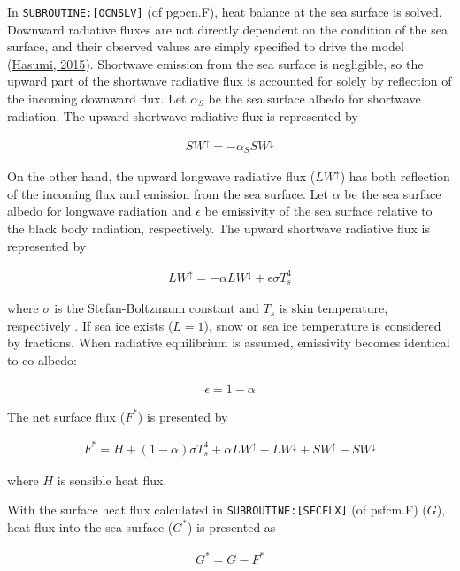 In \texttt{SUBROUTINE:{[}OCNSLV{]}} (of pgocn.F), heat balance at the
sea surface is solved. Downward radiative fluxes are not directly
dependent on the condition of the sea surface, and their observed values
are simply specified to drive the model
(\href{https://ccsr.aori.u-tokyo.ac.jp/~hasumi/COCO/coco4.pdf}{Hasumi,
2015}). Shortwave emission from the sea surface is negligible, so the
upward part of the shortwave radiative flux is accounted for solely by
reflection of the incoming downward flux. Let \(\alpha _S\) be the sea
surface albedo for shortwave radiation. The upward shortwave radiative
flux is represented by

\begin{eqnarray}
    SW^\uparrow = - \alpha_S SW^\downarrow
\end{eqnarray}

On the other hand, the upward longwave radiative flux (\(LW^\uparrow\))
has both reflection of the incoming flux and emission from the sea
surface. Let \(\alpha\) be the sea surface albedo for longwave radiation
and \(\epsilon\) be emissivity of the sea surface relative to the black
body radiation, respectively. The upward shortwave radiative flux is
represented by

\begin{eqnarray}
    LW^\uparrow = - \alpha LW^\downarrow + \epsilon \sigma T_s ^4
\end{eqnarray}

where \(\sigma\) is the Stefan-Boltzmann constant and \(T_s\) is skin
temperature, respectively . If sea ice exists (\(L=1\)), snow or sea ice
temperature is considered by fractions. When radiative equilibrium is
assumed, emissivity becomes identical to co-albedo:

\begin{eqnarray}
    \epsilon = 1 - \alpha
\end{eqnarray}

The net surface flux (\(F^*\)) is presented by

\begin{eqnarray}
    F^*=H + (1-\alpha)\sigma T_s^4 + \alpha LW^\uparrow - LW^\downarrow +SW^\uparrow - SW^\downarrow        
\end{eqnarray}

where \(H\) is sensible heat flux.

With the surface heat flux calculated in
\texttt{SUBROUTINE:{[}SFCFLX{]}} (of psfcm.F) (\(G\)), heat flux into
the sea surface (\(G^*\)) is presented as

\begin{eqnarray}
    G^* = G - F^*
\end{eqnarray}

